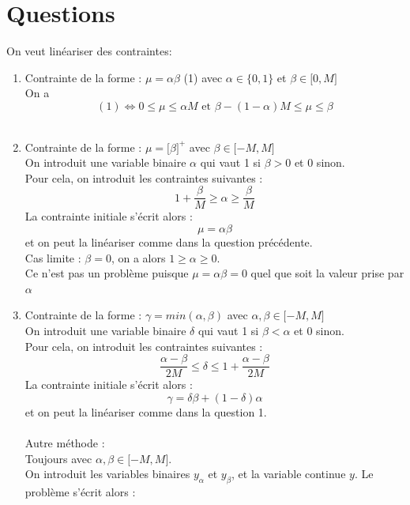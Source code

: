 \documentclass[a4paper,12pt]{article}
\begin{document}
\section{Questions}
On veut linéariser des contraintes:
\\
\begin {enumerate}
\item { 
    Contrainte de la forme : $\mu = \alpha \beta$ (1) avec $\alpha \in \lbrace 0,1 \rbrace$ et $\beta \in \lbrack 0, M \rbrack$ \\ 
    On a  $$(1) \iff 0 \leq \mu \leq \alpha M \text{  et  } \beta - (1 - \alpha)M \leq \mu \leq \beta$$
    }
\\
\item {
    Contrainte de la forme : $ \mu = \lbrack \beta \rbrack ^+$ avec $\beta \in \lbrack -M, M \rbrack$ \\
    On introduit une variable binaire $\alpha$ qui vaut 1 si $\beta > 0$ et 0 sinon. \\
    Pour cela, on introduit les contraintes suivantes :
    $$ 1 + \frac{\beta}{M} \geq \alpha \geq \frac{\beta}{M}$$
    La contrainte initiale s'écrit alors :
    $$ \mu = \alpha \beta $$
    et on peut la linéariser comme dans la question précédente. \\
    Cas limite : $\beta = 0$, on a alors $1 \geq \alpha \geq 0$. \\
    Ce n'est pas un problème puisque $\mu = \alpha \beta = 0$ quel que soit la valeur prise par $\alpha$
    }
\\
\item {
    Contrainte de la forme : $ \gamma = min(\alpha, \beta)$ avec $\alpha, \beta \in \lbrack -M, M \rbrack$ \\
    On introduit une variable binaire $\delta$ qui vaut 1 si $\beta < \alpha$ et 0 sinon. \\
    Pour cela, on introduit les contraintes suivantes :
    $$ \frac{\alpha - \beta}{2M} \leq \delta \leq 1 + \frac{\alpha - \beta}{2M}$$
    La contrainte initiale s'écrit alors :
    $$ \gamma = \delta \beta + (1 - \delta) \alpha $$
    et on peut la linéariser comme dans la question 1. \\
    \\
    Autre méthode : \\
    Toujours avec $ \alpha, \beta \in \lbrack -M, M \rbrack$. \\
    On introduit les variables binaires $y_\alpha$ et $y_\beta$, et la variable continue $y$.
    Le problème s'écrit alors :
    \begin{equation}

\end{equation}}
\end{enumerate}
\end{document}
